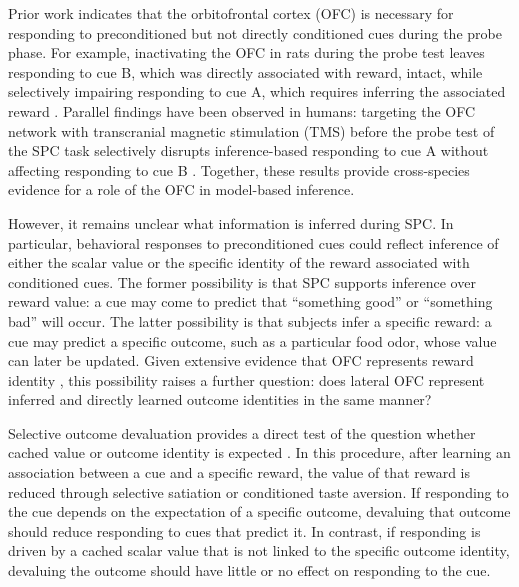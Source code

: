\documentclass[12pt,letterpaper]{article}
\begin{document}
Prior work indicates that the orbitofrontal cortex (OFC) is necessary for responding to preconditioned but not directly conditioned cues during the probe phase. For example, inactivating the OFC in rats during the probe test leaves responding to cue B, which was directly associated with reward, intact, while selectively impairing responding to cue A, which requires inferring the associated reward \citep{jones12}.  Parallel findings have been observed in humans: targeting the OFC network with transcranial magnetic stimulation (TMS) before the probe test of the SPC task selectively disrupts inference-based responding to cue A without affecting responding to cue B \citep{wang2020targeted}. Together, these results provide cross-species evidence for a role of the OFC in model-based inference.

However, it remains unclear what information is inferred during SPC. In particular, behavioral responses to preconditioned cues could reflect inference of either the scalar value or the specific identity of the reward associated with conditioned cues. The former possibility is that SPC supports inference over reward value: a cue may come to predict that ``something good'' or ``something bad'' will occur. The latter possibility is that subjects infer a specific reward: a cue may predict a specific outcome, such as a particular food odor, whose value can later be updated. Given extensive evidence that OFC represents reward identity \citep{klein2013segregated,mcnamee13,RN14,howard2015identity,howard2017identity,howard2018identity,howard2021specific,liuyaoatt24,witkowski2026identity}, this possibility raises a further question: does lateral OFC represent inferred and directly learned outcome identities in the same manner?


Selective outcome devaluation provides a direct test of the question whether cached value or outcome identity is expected \citep{HowRey2020,liu2025distinct,hart20}. In this procedure, after learning an association between a cue and a specific reward, the value of that reward is reduced through selective satiation or conditioned taste aversion. If responding to the cue depends on the expectation of a specific outcome, devaluing that outcome should reduce responding to cues that predict it. In contrast, if responding is driven by a cached scalar value that is not linked to the specific outcome identity, devaluing the outcome should have little or no effect on responding to the cue.
\end{document}
